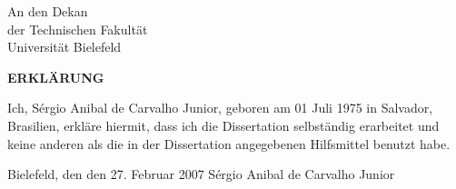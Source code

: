 \documentclass[11pt,a4paper]{article}
\begin{document}
\pagestyle{empty}
\noindent
An den Dekan\\
der Technischen Fakult\"at\\
Universit\"at Bielefeld

\vspace{2cm}

\begin{center}
  {\bf \Large ERKL\"ARUNG}
\end{center}

\vspace{2cm}

\noindent Ich, S\'ergio Anibal de Carvalho Junior, geboren am 01 Juli 1975 in
Salvador, Brasilien, erkl\"are hiermit, dass ich die Dissertation selbst\"andig
erarbeitet und keine anderen als die in der Dissertation angegebenen Hilfsmittel
benutzt habe.

\vspace{4cm}


\noindent Bielefeld, den den 27. Februar 2007 \hfill S\'ergio Anibal de Carvalho Junior
\end{document}
